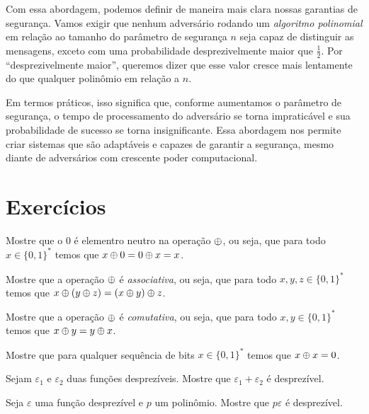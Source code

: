 Com essa abordagem, podemos definir de maneira mais clara nossas garantias de segurança.
Vamos exigir que nenhum adversário rodando um {\em algoritmo polinomial} em relação ao tamanho do parâmetro de segurança $n$ seja capaz de distinguir as mensagens, exceto com uma probabilidade desprezivelmente maior que $\frac{1}{2}$.
Por ``desprezivelmente maior'', queremos dizer que esse valor cresce mais lentamente do que qualquer polinômio em relação a $n$.

Em termos práticos, isso significa que, conforme aumentamos o parâmetro de segurança, o tempo de processamento do adversário se torna impraticável e sua probabilidade de sucesso se torna insignificante.
Essa abordagem nos permite criar sistemas que são adaptáveis e capazes de garantir a segurança, mesmo diante de adversários com crescente poder computacional.


\section{Exercícios}
\label{sec:exercicios}

\begin{exercicio}
  Mostre que o $0$ é elementro neutro na operação $\oplus$, ou seja, que para todo $x \in \{0,1\}^*$ temos que $x \oplus 0 = 0 \oplus x = x$.
\end{exercicio}

\begin{exercicio}
  Mostre que a operação $\oplus$ é {\em associativa}, ou seja, que para todo $x,y,z \in \{0,1\}^*$ temos que $x \oplus (y \oplus z) = (x \oplus y) \oplus z$.
\end{exercicio}

\begin{exercicio}
  Mostre que a operação $\oplus$ é {\em comutativa}, ou seja, que para todo $x,y \in \{0,1\}^*$ temos que $x \oplus y = y \oplus x$.
\end{exercicio}

\begin{exercicio}
  Mostre que para qualquer sequência de bits $x \in \{0,1\}^*$ temos que $x \oplus x = 0$.
\end{exercicio}

\begin{exercicio}
  Sejam $\varepsilon_1$ e $\varepsilon_2$ duas funções desprezíveis.
  Mostre que $\varepsilon_1 + \varepsilon_2$ é desprezível.
\end{exercicio}

\begin{exercicio}
  Seja $\varepsilon$ uma função desprezível e $p$ um polinômio.
  Mostre que $p\varepsilon$ é desprezível.
\end{exercicio}


